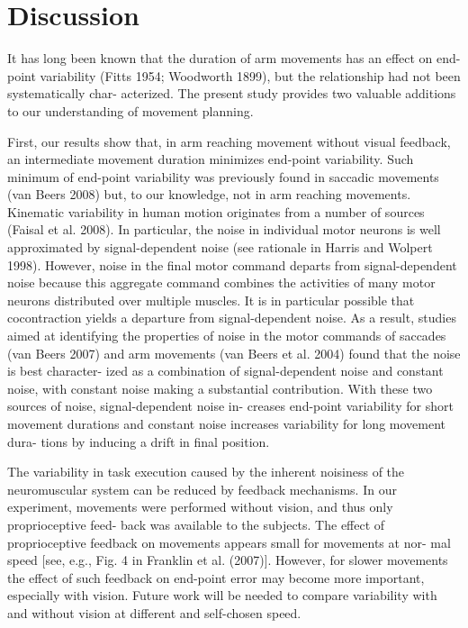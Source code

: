\section{Discussion}

It has long been known that the duration of arm movements
has an effect on end-point variability (Fitts 1954; Woodworth 1899), but the relationship had not been systematically char- acterized. The present study provides two valuable additions to our understanding of movement planning.

First, our results show that, in arm reaching movement
without visual feedback, an intermediate movement duration minimizes end-point variability. Such minimum of end-point variability was previously found in saccadic movements (van Beers 2008) but, to our knowledge, not in arm reaching movements. Kinematic variability in human motion originates from a number of sources (Faisal et al. 2008). In particular, the noise in individual motor neurons is well approximated by signal-dependent noise (see rationale in Harris and Wolpert 1998). However, noise in the final motor command departs from signal-dependent noise because this aggregate command combines the activities of many motor neurons distributed over multiple muscles. It is in particular possible that cocontraction yields a departure from signal-dependent noise. As a result, studies aimed at identifying the properties of noise in the motor commands of saccades (van Beers 2007) and arm movements (van Beers et al. 2004) found that the noise is best character- ized as a combination of signal-dependent noise and constant noise, with constant noise making a substantial contribution. With these two sources of noise, signal-dependent noise in- creases end-point variability for short movement durations and constant noise increases variability for long movement dura- tions by inducing a drift in final position.

The variability in task execution caused by the inherent noisiness of the neuromuscular system can be reduced by feedback mechanisms. In our experiment, movements were performed without vision, and thus only proprioceptive feed- back was available to the subjects. The effect of proprioceptive feedback on movements appears small for movements at nor- mal speed [see, e.g., Fig. 4 in Franklin et al. (2007)]. However, for slower movements the effect of such feedback on end-point error may become more important, especially with vision. Future work will be needed to compare variability with and without vision at different and self-chosen speed.

